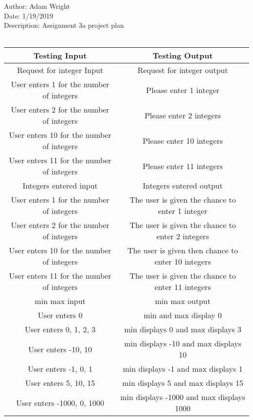 \documentclass{article}
\begin{document}
	
Author:            Adam Wright\\

Date:              1/19/2019\\

Description:       Assignment 3a project plan\\ \\


\begin{tabular}{|c|c|}
	\hline
	Testing Input&Testing Output\\
	\hline
	Request for integer Input&Request for integer output\\
	\hline
	User enters 1 for the number of integers&Please enter 1 integer\\
	User enters 2 for the number of integers&Please enter 2 integers\\
	User enters 10 for the number of integers&Please enter 10 integers\\
	User enters 11 for the number of integers&Please enter 11 integers\\
	\hline
	Integers entered input&Integers entered output\\
	\hline
	User enters 1 for the number of integers&The user is given the chance to enter 1 integer\\
	User enters 2 for the number of integers&The user is given the chance to enter 2 integers\\
	User enters 10 for the number of integers&The user is given then chance to enter 10 integers\\
	User enters 11 for the number of integers&The user is given the chance to enter 11 integers\\
	\hline
	min max input&min max output\\
	\hline
	User enters 0&min and max display 0\\
	User enters 0, 1, 2, 3&min displays 0 and max displays 3\\
	User enters -10, 10&min displays -10 and max displays 10\\
	User enters -1, 0, 1&min displays -1 and max displays 1\\
	User enters 5, 10, 15&min displays 5 and max displays 15\\
	User enters -1000, 0, 1000&min displays -1000 and max displays 1000\\
	\hline
\end{tabular}\\ \\ \\
\end{document}

